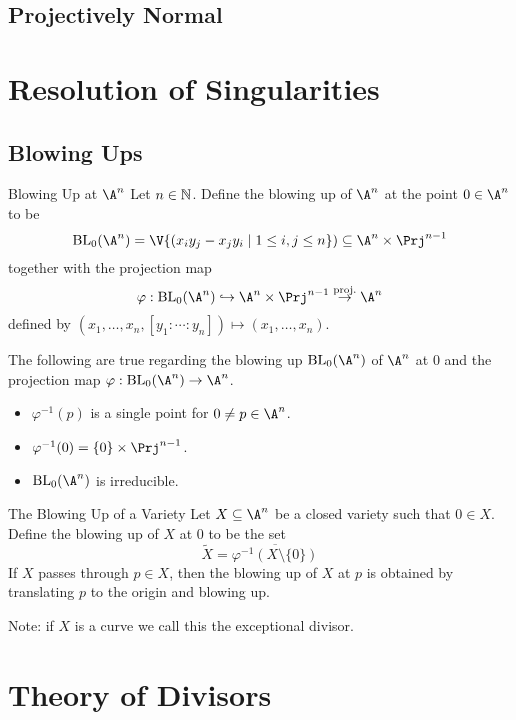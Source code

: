 \documentclass[a4paper]{article}
\begin{document}
\subsection{Projectively Normal}

\pagebreak
\section{Resolution of Singularities}
\subsection{Blowing Ups}
\begin{defn}{Blowing Up at $\A^n$}{} Let $n\in\mathbb{N}$. Define the blowing up of $\A^n$ at the point $0\in\A^n$ to be $$\text{BL}_0(\A^n)=\V\{(x_iy_j-x_jy_i\;|\;1\leq i,j\leq n\})\subseteq\A^n\times\Prj^{n-1}$$ together with the projection map $$\varphi:\text{BL}_0(\A^n)\hookrightarrow\A^n\times\Prj^{n-1}\overset{\text{proj.}}{\rightarrow}\A^n$$ defined by $(x_1,\dots,x_n,[y_1:\cdots:y_n])\mapsto(x_1,\dots,x_n)$. 
\end{defn}

\begin{prp}{}{} The following are true regarding the blowing up $\text{BL}_0(\A^n)$ of $\A^n$ at $0$ and the projection map $\varphi:\text{BL}_0(\A^n)\to\A^n$. 
\begin{itemize}
\item $\varphi^{-1}(p)$ is a single point for $0\neq p\in\A^n$. 
\item $\varphi^{-1}(0)=\{0\}\times\Prj^{n-1}$. 
\item $\text{BL}_0(\A^n)$ is irreducible. 
\end{itemize}
\end{prp}

\begin{defn}{The Blowing Up of a Variety}{} Let $X\subseteq\A^n$ be a closed variety such that $0\in X$. Define the blowing up of $X$ at $0$ to be the set $$\widetilde{X}=\overline{\varphi^{-1}(X\setminus\{0\})}$$ If $X$ passes through $p\in X$, then the blowing up of $X$ at $p$ is obtained by translating $p$ to the origin and blowing up. 
\end{defn}

Note: if $X$ is a curve we call this the exceptional divisor. 

\pagebreak
\section{Theory of Divisors}
\end{document}
